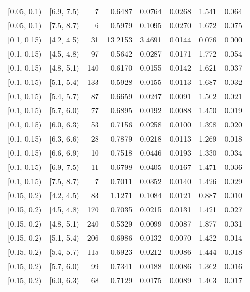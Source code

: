 \begin{longtable}{| l | l | r | r | r | r | r | r |}
        $[$0.05, 0.1$)$ & $[$6.9, 7.5$)$ & 7 & 0.6487 & 0.0764 & 0.0268 & 1.541 & 0.064 \\
        $[$0.05, 0.1$)$ & $[$7.5, 8.7$)$ & 6 & 0.5979 & 0.1095 & 0.0270 & 1.672 & 0.075 \\
        $[$0.1, 0.15$)$ & $[$4.2, 4.5$)$ & 31 & 13.2153 & 3.4691 & 0.0144 & 0.076 & 0.000 \\
        $[$0.1, 0.15$)$ & $[$4.5, 4.8$)$ & 97 & 0.5642 & 0.0287 & 0.0171 & 1.772 & 0.054 \\
        $[$0.1, 0.15$)$ & $[$4.8, 5.1$)$ & 140 & 0.6170 & 0.0155 & 0.0142 & 1.621 & 0.037 \\
        $[$0.1, 0.15$)$ & $[$5.1, 5.4$)$ & 133 & 0.5928 & 0.0155 & 0.0113 & 1.687 & 0.032 \\
        $[$0.1, 0.15$)$ & $[$5.4, 5.7$)$ & 87 & 0.6659 & 0.0247 & 0.0091 & 1.502 & 0.021 \\
        $[$0.1, 0.15$)$ & $[$5.7, 6.0$)$ & 77 & 0.6895 & 0.0192 & 0.0088 & 1.450 & 0.019 \\
        $[$0.1, 0.15$)$ & $[$6.0, 6.3$)$ & 53 & 0.7156 & 0.0258 & 0.0100 & 1.398 & 0.020 \\
        $[$0.1, 0.15$)$ & $[$6.3, 6.6$)$ & 28 & 0.7879 & 0.0218 & 0.0113 & 1.269 & 0.018 \\
        $[$0.1, 0.15$)$ & $[$6.6, 6.9$)$ & 10 & 0.7518 & 0.0446 & 0.0193 & 1.330 & 0.034 \\
        $[$0.1, 0.15$)$ & $[$6.9, 7.5$)$ & 11 & 0.6798 & 0.0405 & 0.0167 & 1.471 & 0.036 \\
        $[$0.1, 0.15$)$ & $[$7.5, 8.7$)$ & 7 & 0.7011 & 0.0352 & 0.0140 & 1.426 & 0.029 \\
        $[$0.15, 0.2$)$ & $[$4.2, 4.5$)$ & 83 & 1.1271 & 0.1084 & 0.0121 & 0.887 & 0.010 \\
        $[$0.15, 0.2$)$ & $[$4.5, 4.8$)$ & 170 & 0.7035 & 0.0215 & 0.0131 & 1.421 & 0.027 \\
        $[$0.15, 0.2$)$ & $[$4.8, 5.1$)$ & 240 & 0.5329 & 0.0099 & 0.0087 & 1.877 & 0.031 \\
        $[$0.15, 0.2$)$ & $[$5.1, 5.4$)$ & 206 & 0.6986 & 0.0132 & 0.0070 & 1.432 & 0.014 \\
        $[$0.15, 0.2$)$ & $[$5.4, 5.7$)$ & 115 & 0.6923 & 0.0212 & 0.0086 & 1.444 & 0.018 \\
        $[$0.15, 0.2$)$ & $[$5.7, 6.0$)$ & 99 & 0.7341 & 0.0188 & 0.0086 & 1.362 & 0.016 \\
        $[$0.15, 0.2$)$ & $[$6.0, 6.3$)$ & 68 & 0.7129 & 0.0175 & 0.0089 & 1.403 & 0.017 \\

\end{longtable}
